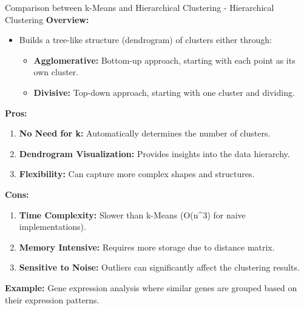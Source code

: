 \documentclass[aspectratio=169]{beamer}
\begin{document}
\begin{frame}[fragile]{Comparison between k-Means and Hierarchical Clustering - Hierarchical Clustering}
    \textbf{Overview:}
    \begin{itemize}
        \item Builds a tree-like structure (dendrogram) of clusters either through:
        \begin{itemize}
            \item \textbf{Agglomerative:} Bottom-up approach, starting with each point as its own cluster.
            \item \textbf{Divisive:} Top-down approach, starting with one cluster and dividing.
        \end{itemize}
    \end{itemize}

    \textbf{Pros:}
    \begin{enumerate}
        \item \textbf{No Need for k:} Automatically determines the number of clusters.
        \item \textbf{Dendrogram Visualization:} Provides insights into the data hierarchy.
        \item \textbf{Flexibility:} Can capture more complex shapes and structures.
    \end{enumerate}

    \textbf{Cons:}
    \begin{enumerate}
        \item \textbf{Time Complexity:} Slower than k-Means (O(n^3) for naive implementations).
        \item \textbf{Memory Intensive:} Requires more storage due to distance matrix.
        \item \textbf{Sensitive to Noise:} Outliers can significantly affect the clustering results.
    \end{enumerate}

    \textbf{Example:} Gene expression analysis where similar genes are grouped based on their expression patterns.
\end{frame}
\end{document}
